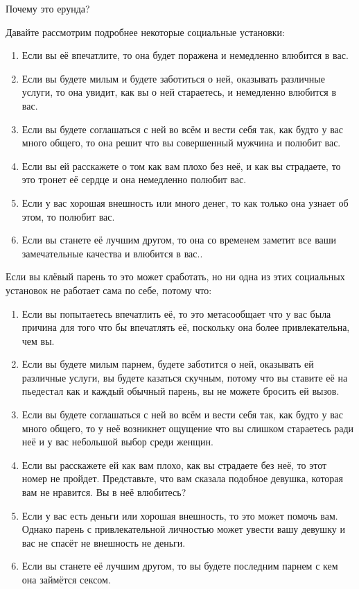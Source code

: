 Почему это ерунда?

Давайте рассмотрим подробнее некоторые социальные установки:

\begin{enumerate}
\item Если вы её впечатлите, то она будет поражена и немедленно влюбится в вас.
\item Если вы будете милым и будете заботиться о ней, оказывать различные услуги, то она увидит, как вы о ней стараетесь, и немедленно влюбится в вас.
\item Если вы будете соглашаться с ней во всём и вести себя так, как будто у вас много общего, то она решит что вы совершенный мужчина и полюбит вас.
\item Если вы ей расскажете о том как вам плохо без неё, и как вы страдаете, то это тронет её сердце и она немедленно полюбит вас.
\item Если у вас хорошая внешность или много денег, то как только она узнает об этом, то полюбит вас.
\item Если вы станете её лучшим другом, то она со временем заметит все ваши замечательные качества и влюбится в вас..
\end{enumerate}
Если вы клёвый парень то это может сработать, но ни одна из этих социальных установок не работает сама по себе, потому что:
\begin{enumerate}
\item Если вы попытаетесь впечатлить её, то это метасообщает что у вас была причина для того что бы впечатлять её, поскольку она более привлекательна, чем вы.
\item Если вы будете милым парнем, будете заботится о ней, оказывать ей различные услуги, вы будете казаться скучным, потому что вы ставите её на пьедестал как и каждый обычный парень, вы не можете бросить ей вызов.
\item Если вы будете соглашаться с ней во всём и вести себя так, как будто у вас много общего, то у неё возникнет ощущение что вы слишком стараетесь ради неё и у вас небольшой выбор среди женщин.
\item Если вы расскажете ей как вам плохо, как вы страдаете без неё, то этот номер не пройдет. Представьте, что вам сказала подобное девушка, которая вам не нравится. Вы в неё влюбитесь?
\item Если у вас есть деньги или хорошая внешность, то это может помочь вам. Однако парень с привлекательной личностью может увести вашу девушку и вас не спасёт не внешность не деньги.
\item Если вы станете её лучшим другом, то вы будете последним парнем с кем она займётся сексом.
\end{enumerate}

